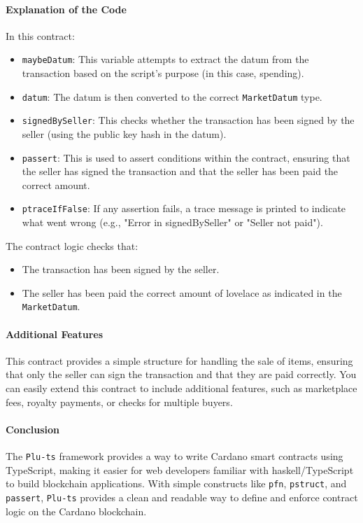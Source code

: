 \paragraph{Explanation of the Code}
In this contract:
\begin{itemize}
    \item \texttt{maybeDatum}: This variable attempts to extract the datum from the transaction based on the script’s purpose (in this case, spending).
    \item \texttt{datum}: The datum is then converted to the correct \texttt{MarketDatum} type.
    \item \texttt{signedBySeller}: This checks whether the transaction has been signed by the seller (using the public key hash in the datum).
    \item \texttt{passert}: This is used to assert conditions within the contract, ensuring that the seller has signed the transaction and that the seller has been paid the correct amount.
    \item \texttt{ptraceIfFalse}: If any assertion fails, a trace message is printed to indicate what went wrong (e.g., "Error in signedBySeller" or "Seller not paid").
\end{itemize}

The contract logic checks that:
\begin{itemize}
    \item The transaction has been signed by the seller.
    \item The seller has been paid the correct amount of lovelace as indicated in the \texttt{MarketDatum}.
\end{itemize}

\paragraph{Additional Features}
This contract provides a simple structure for handling the sale of items, ensuring that only the seller can sign the transaction and that they are paid correctly. You can easily extend this contract to include additional features, such as marketplace fees, royalty payments, or checks for multiple buyers.

\paragraph{Conclusion}
The \texttt{Plu-ts} framework provides a way to write Cardano smart contracts using TypeScript, making it easier for web developers familiar with haskell/TypeScript to build blockchain applications. With simple constructs like \texttt{pfn}, \texttt{pstruct}, and \texttt{passert}, \texttt{Plu-ts} provides a clean and readable way to define and enforce contract logic on the Cardano blockchain.


